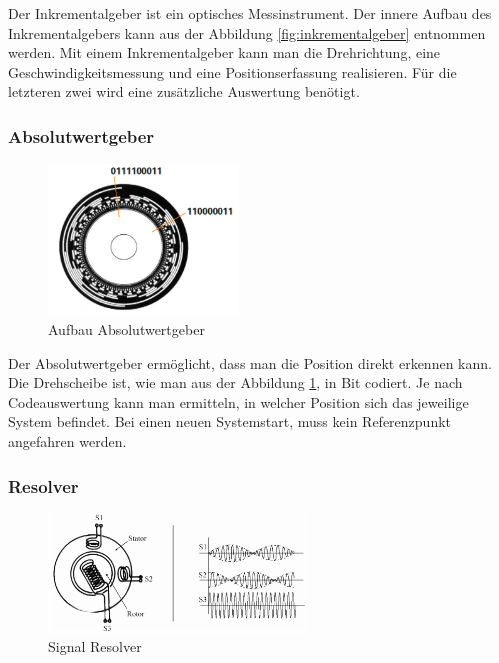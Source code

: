 Der Inkrementalgeber ist ein optisches Messinstrument. Der innere Aufbau des Inkrementalgebers kann aus der Abbildung \ref{fig:inkrementalgeber} entnommen werden. 
Mit einem Inkrementalgeber kann man die Drehrichtung, eine Geschwindigkeitsmessung und eine Positionserfassung realisieren. Für die letzteren zwei wird eine zusätzliche Auswertung benötigt. 

\subsubsection{Absolutwertgeber}
\label{sec:absolutwertgeber}

\begin{figure}[H]
\begin{center}
	\includegraphics[width=0.45\textwidth]{fig/Absolutwertgeber}
	\caption{Aufbau Absolutwertgeber \label{fig:absolutwertgeber}}
\end{center}
\end{figure}

Der Absolutwertgeber ermöglicht, dass man die Position direkt erkennen kann. Die Drehscheibe ist, wie man aus der Abbildung \ref{fig:absolutwertgeber}, in Bit codiert. Je nach Codeauswertung kann man ermitteln, in welcher Position sich das jeweilige System befindet. 
Bei einen neuen Systemstart, muss kein Referenzpunkt angefahren werden.

\subsubsection{Resolver}
\label{sec:resolver}

\begin{figure}[H]
\begin{center}
	\includegraphics[width=0.61\textwidth]{fig/Resolver}
	\caption{Signal Resolver \label{fig:signalResolver}}
\end{center}
\end{figure}


